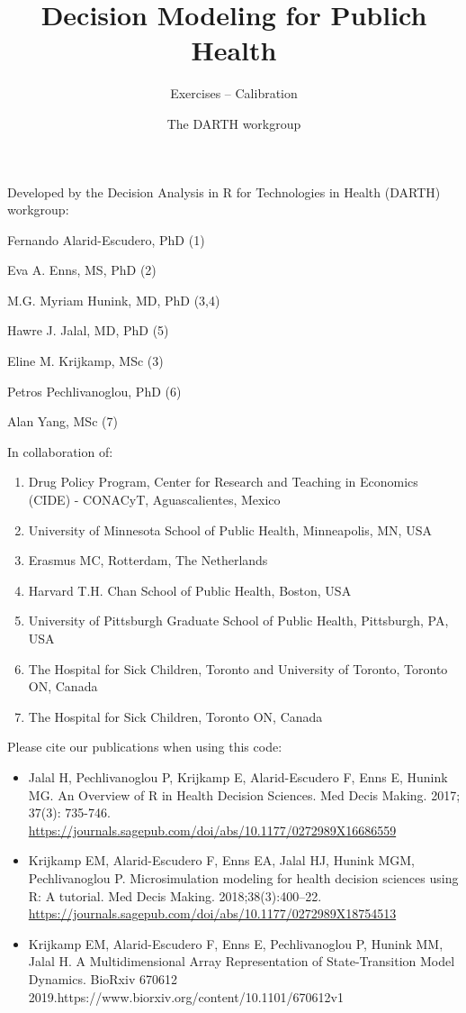 \documentclass[
]{article}
\title{Decision Modeling for Publich Health}
\subtitle{Exercises -- Calibration}
\author{The DARTH workgroup}
\date{}
\providecommand{\tightlist}{%
  \setlength{\itemsep}{0pt}\setlength{\parskip}{0pt}}
\begin{document}
\maketitle

Developed by the Decision Analysis in R for Technologies in Health
(DARTH) workgroup:

Fernando Alarid-Escudero, PhD (1)

Eva A. Enns, MS, PhD (2)

M.G. Myriam Hunink, MD, PhD (3,4)

Hawre J. Jalal, MD, PhD (5)

Eline M. Krijkamp, MSc (3)

Petros Pechlivanoglou, PhD (6)

Alan Yang, MSc (7)

In collaboration of:

\begin{enumerate}
\def\labelenumi{\arabic{enumi}.}
\tightlist
\item
  Drug Policy Program, Center for Research and Teaching in Economics
  (CIDE) - CONACyT, Aguascalientes, Mexico
\item
  University of Minnesota School of Public Health, Minneapolis, MN, USA
\item
  Erasmus MC, Rotterdam, The Netherlands
\item
  Harvard T.H. Chan School of Public Health, Boston, USA
\item
  University of Pittsburgh Graduate School of Public Health, Pittsburgh,
  PA, USA
\item
  The Hospital for Sick Children, Toronto and University of Toronto,
  Toronto ON, Canada
\item
  The Hospital for Sick Children, Toronto ON, Canada
\end{enumerate}

Please cite our publications when using this code:

\begin{itemize}
\item
  Jalal H, Pechlivanoglou P, Krijkamp E, Alarid-Escudero F, Enns E,
  Hunink MG. An Overview of R in Health Decision Sciences. Med Decis
  Making. 2017; 37(3): 735-746.
  \url{https://journals.sagepub.com/doi/abs/10.1177/0272989X16686559}
\item
  Krijkamp EM, Alarid-Escudero F, Enns EA, Jalal HJ, Hunink MGM,
  Pechlivanoglou P. Microsimulation modeling for health decision
  sciences using R: A tutorial. Med Decis Making. 2018;38(3):400--22.
  \url{https://journals.sagepub.com/doi/abs/10.1177/0272989X18754513}
\item
  Krijkamp EM, Alarid-Escudero F, Enns E, Pechlivanoglou P, Hunink MM,
  Jalal H. A Multidimensional Array Representation of State-Transition
  Model Dynamics. BioRxiv 670612
  2019.https://www.biorxiv.org/content/10.1101/670612v1
\end{itemize}
\end{document}
